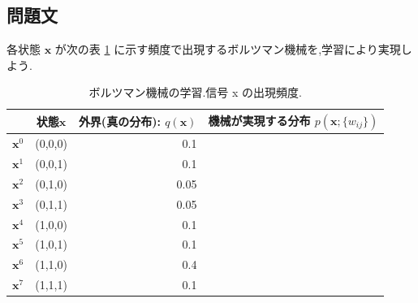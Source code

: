 \documentclass[a4j, uplatex, fleqn, dvipdfmx]{jsarticle} %
\begin{document}
\subsection{問題文}
各状態 $\bm{x}$ が次の表 \ref{table:q2} に示す頻度で出現するボルツマン機械を,学習により実現しよう.

\begin{table}[H]
  \caption{ボルツマン機械の学習.信号 x の出現頻度.}
  \label{table:q2}
  \centering
  \begin{tabular}{|c|c|r|r|}
    \hline
     & 状態$\bm{x}$ & 外界(真の分布): $q(\bm{x})$ & 機械が実現する分布 $p(\bm{x}; \{w_{ij}\})$ \\
    \hline
    $\bm{x}^{0}$ & (0,0,0) & 0.1 & \\
    $\bm{x}^{1}$ & (0,0,1) & 0.1 & \\
    $\bm{x}^{2}$ & (0,1,0) & 0.05 & \\
    $\bm{x}^{3}$ & (0,1,1) & 0.05 & \\
    $\bm{x}^{4}$ & (1,0,0) & 0.1 & \\
    $\bm{x}^{5}$ & (1,0,1) & 0.1 & \\
    $\bm{x}^{6}$ & (1,1,0) & 0.4 & \\
    $\bm{x}^{7}$ & (1,1,1) & 0.1 & \\
    \hline
  \end{tabular}
\end{table}
\end{document}

